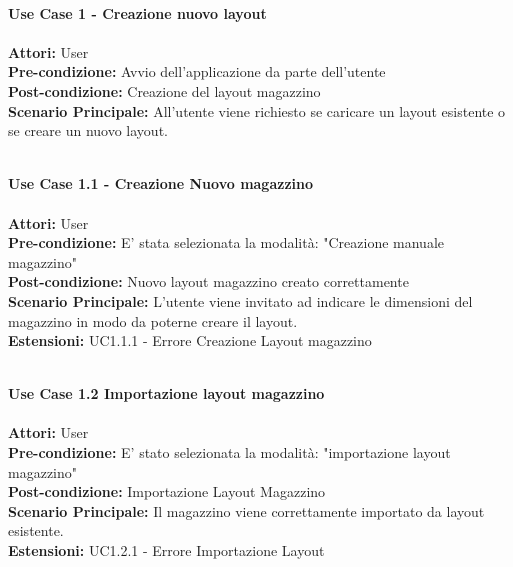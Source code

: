 \Large\textbf{}\\
\Large\textbf{Use Case 1 - Creazione nuovo layout} \\
\vspace{0.5cm}
\large\textbf{} \\
\textbf{Attori:} User\\
\textbf{Pre-condizione:} Avvio dell'applicazione da parte dell'utente\\
\textbf{Post-condizione: } Creazione del layout magazzino\\
\textbf{Scenario Principale:}  All'utente viene richiesto se caricare un layout esistente o se creare 
un nuovo layout.\\
\vspace{0.5cm}

\Large\textbf{}\\
\Large\textbf{Use Case 1.1 - Creazione Nuovo magazzino} \\
\vspace{0.5cm}
\large\textbf{} \\
\textbf{Attori:} User\\
\textbf{Pre-condizione:} E' stata selezionata la modalità: "Creazione manuale magazzino" \\
\textbf{Post-condizione: } Nuovo layout magazzino creato correttamente\\
\textbf{Scenario Principale:}  L'utente viene invitato ad indicare le dimensioni del magazzino in modo da poterne creare il layout.\\
\textbf{Estensioni: } UC1.1.1 - Errore Creazione Layout magazzino\\
\vspace{0.5cm}

\Large\textbf{}\\
\Large\textbf{Use Case 1.2 Importazione layout magazzino} \\
\vspace{0.5cm}
\large\textbf{} \\
\textbf{Attori:} User\\
\textbf{Pre-condizione:} E' stato selezionata la modalità: "importazione layout magazzino" \\
\textbf{Post-condizione: } Importazione Layout Magazzino\\
\textbf{Scenario Principale:}  Il magazzino viene correttamente importato da layout esistente.\\
\textbf{Estensioni: } UC1.2.1 - Errore Importazione Layout\\
\vspace{0.5cm}


